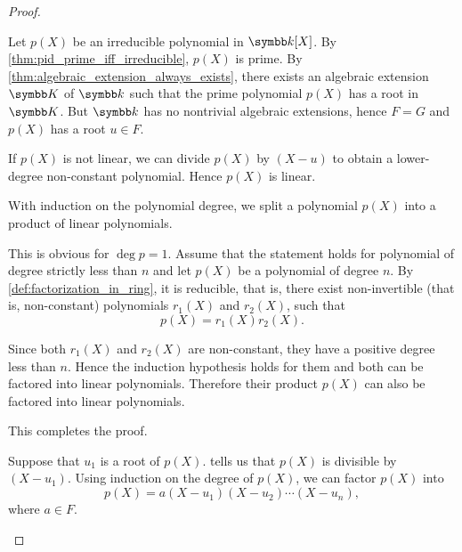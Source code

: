 \begin{proof}
  \begin{description}
     Let \( p(X) \) be an irreducible polynomial in \( \Kl[X] \). By \cref{thm:pid_prime_iff_irreducible}, \( p(X) \) is prime. By \cref{thm:algebraic_extension_always_exists}, there exists an algebraic extension \( \K \) of \( \Kl \) such that the prime polynomial \( p(X) \) has a root in \( \K \). But \( \Kl \) has no nontrivial algebraic extensions, hence \( F = G \) and \( p(X) \) has a root \( u \in F \).

    If \( p(X) \) is not linear\LEM, we can divide \( p(X) \) by \( (X - u) \) to obtain a lower-degree non-constant polynomial. Hence \( p(X) \) is linear.

     With induction on the polynomial degree, we split a polynomial \( p(X) \) into a product of linear polynomials.

    This is obvious for \( \deg p = 1 \). Assume that the statement holds for polynomial of degree strictly less than \( n \) and let \( p(X) \) be a polynomial of degree \( n \). By \cref{def:factorization_in_ring}, it is reducible, that is, there exist non-invertible (that is, non-constant) polynomials \( r_1(X) \) and \( r_2(X) \), such that
    \begin{equation*}
      p(X) = r_1(X) r_2(X).
    \end{equation*}

    Since both \( r_1(X) \) and \( r_2(X) \) are non-constant, they have a positive degree less than \( n \). Hence the induction hypothesis holds for them and both can be factored into linear polynomials. Therefore their product \( p(X) \) can also be factored into linear polynomials.

    This completes the proof.

     Suppose that \( u_1 \) is a root of \( p(X) \).  tells us that \( p(X) \) is divisible by \( (X - u_1) \). Using induction on the degree of \( p(X) \), we can factor \( p(X) \) into
    \begin{equation*}
      p(X) = a (X - u_1) (X - u_2) \cdots (X - u_n),
    \end{equation*}
    where \( a \in F \).


\end{description}
\end{proof}
